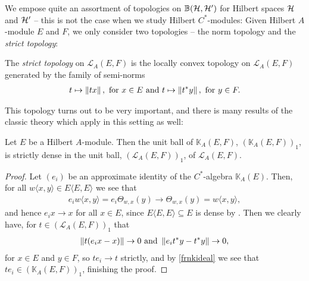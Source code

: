 We empose quite an assortment of topologies on $\mathbb{B}(\mathcal{H},\mathcal{H}')$ for Hilbert spaces $\mathcal{H}$ and $\mathcal{H}'$ -- this is not the case when we study Hilbert $C^*$-modules: Given Hilbert $A$-module $E$ and $F$, we only consider two topologies -- the norm topology and the \emph{strict topology}:
\begin{definition}
	The \emph{strict topology} on $\mathcal{L}_A(E,F)$ is the locally convex topology on $\mathcal{L}_A(E,F)$ generated by the family of semi-norms 
	\begin{align*}
		t \mapsto \left\lVert tx\right\rVert, \text{ for } x \in E \text{ and }		t \mapsto \left\lVert t^*y \right\rVert, \text{ for } y \in F.
	\end{align*}
\end{definition}
This topology turns out to be very important, and there is many results of the classic theory which apply in this setting as well:
\begin{proposition}
	Let $E$ be a Hilbert $A$-module. Then the unit ball of $\mathbb{K}_A(E,F)$, $(\mathbb{K}_A(E,F))_1$, is strictly dense in the unit ball, $(\mathcal{L}_A(E,F))_1$, of $\mathcal{L}_A(E,F)$.
\end{proposition}
\begin{proof}
	Let $(e_i)$ be an approximate identity of the $C^*$-algebra $\mathbb{K}_A(E)$. Then, for all $w\langle x,y \rangle \in E\langle E,E \rangle$ we see that
	\begin{align*}
		e_i w\langle x,y \rangle = e_i \Theta_{w,x}(y) \to \Theta_{w,x}(y) = w \langle x,y\rangle,
	\end{align*}
	and hence $e_i x \to x$ for all $x \in E$, since $E\langle E,E\rangle \subseteq E$ is dense by . Then we clearly have, for $t \in (\mathcal{L}_A(E,F))_1$ that
	\begin{align*}
		\left\lVert t(e_ix-x)\right\rVert \to 0 \text{  and  } \left\lVert e_it^*y-t^*y\right\rVert \to 0,
	\end{align*}
	for $x \in E$ and $y \in F$, so $te_i \to t$ strictly, and by \ref{frnkideal} we see that $te_i \in (\mathbb{K}_A(E,F))_1$, finishing the proof.
\end{proof}


